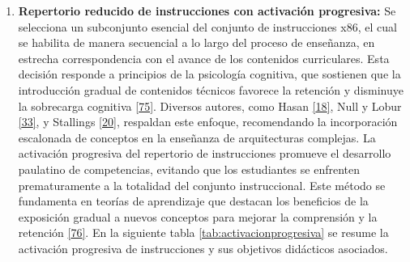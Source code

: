 \documentclass[12pt,oneside]{templates/unerthesis}
\providecommand{\tightlist}{%
  \setlength{\itemsep}{0pt}\setlength{\parskip}{0pt}}
\begin{document}
\begin{enumerate}
\def\labelenumi{\arabic{enumi}.}
\setcounter{enumi}{2}
\tightlist
\item
  \textbf{Repertorio reducido de instrucciones con activación progresiva:}
  Se selecciona un subconjunto esencial del conjunto de instrucciones x86, el cual se habilita de manera secuencial a lo largo del proceso de enseñanza, en estrecha correspondencia con el avance de los contenidos curriculares. Esta decisión responde a principios de la psicología cognitiva, que sostienen que la introducción gradual de contenidos técnicos favorece la retención y disminuye la sobrecarga cognitiva \protect\hyperlink{ref-nationalacademies2018how}{{[}75{]}}. Diversos autores, como Hasan \protect\hyperlink{ref-hasan_survey_2012}{{[}18{]}}, Null y Lobur \protect\hyperlink{ref-null_essentials_2023}{{[}33{]}}, y Stallings \protect\hyperlink{ref-stallings_computer_2021}{{[}20{]}}, respaldan este enfoque, recomendando la incorporación escalonada de conceptos en la enseñanza de arquitecturas complejas.
  La activación progresiva del repertorio de instrucciones promueve el desarrollo paulatino de competencias, evitando que los estudiantes se enfrenten prematuramente a la totalidad del conjunto instruccional. Este método se fundamenta en teorías de aprendizaje que destacan los beneficios de la exposición gradual a nuevos conceptos para mejorar la comprensión y la retención \protect\hyperlink{ref-sweller2010cognitive}{{[}76{]}}. En la siguiente tabla \ref{tab:activacionprogresiva} se resume la activación progresiva de instrucciones y sus objetivos didácticos asociados.
\end{enumerate}

\begin{table}[!h]
\centering
\caption{\label{tab:activacionprogresiva}Activación progresiva del repertorio de instrucciones}
\centering
{}
\end{table}
\end{document}
